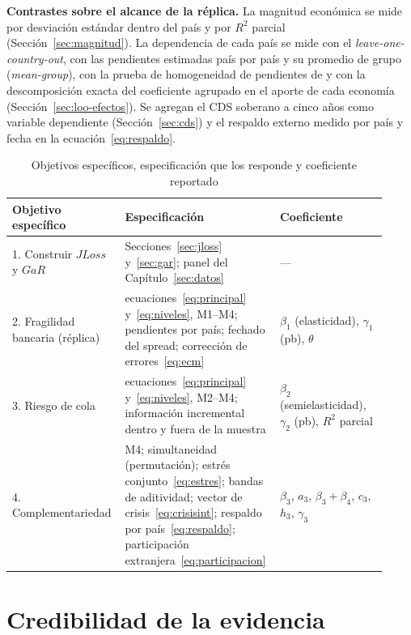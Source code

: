 \textbf{Contrastes sobre el alcance de la réplica.} La magnitud económica se mide por desviación estándar dentro del país y por $R^2$ parcial (Sección~\ref{sec:magnitud}). La dependencia de cada país se mide con el \textit{leave-one-country-out}, con las pendientes estimadas país por país y su promedio de grupo (\textit{mean-group}), con la prueba de homogeneidad de pendientes de \citet{PesaranYamagata2008} y con la descomposición exacta del coeficiente agrupado en el aporte de cada economía (Sección~\ref{sec:loo-efectos}). Se agregan el CDS soberano a cinco años como variable dependiente (Sección~\ref{sec:cds}) y el respaldo externo medido por país y fecha en la ecuación~\eqref{eq:respaldo}.

\begin{table}[htbp]
\centering
\small
\caption[Objetivos específicos y especificaciones]{Objetivos específicos, especificación que los responde y coeficiente reportado}
\label{tab:objetivos-especificaciones}
\begin{tabular}{p{0.28\linewidth}p{0.36\linewidth}p{0.28\linewidth}}
\toprule
Objetivo específico & Especificación & Coeficiente \\
\midrule
1. Construir $JLoss$ y $GaR$ & Secciones~\ref{sec:jloss} y~\ref{sec:gar}; panel del Capítulo~\ref{sec:datos} & --- \\
2. Fragilidad bancaria (réplica) & ecuaciones~\eqref{eq:principal} y~\eqref{eq:niveles}, M1--M4; pendientes por país; fechado del spread; corrección de errores~\eqref{eq:ecm} & $\beta_1$ (elasticidad), $\gamma_1$ (pb), $\theta$ \\
3. Riesgo de cola & ecuaciones~\eqref{eq:principal} y~\eqref{eq:niveles}, M2--M4; información incremental dentro y fuera de la muestra & $\beta_2$ (semielasticidad), $\gamma_2$ (pb), $R^2$ parcial \\
4. Complementariedad & M4; simultaneidad (permutación); estrés conjunto~\eqref{eq:estres}; bandas de aditividad; vector de crisis~\eqref{eq:crisisint}; respaldo por país~\eqref{eq:respaldo}; participación extranjera~\eqref{eq:participacion} & $\beta_3$, $a_3$, $\beta_3+\beta_4$, $c_3$, $h_3$, $\gamma_3$ \\
\bottomrule
\end{tabular}
\end{table}

\section{Credibilidad de la evidencia}
\label{sec:credibilidad}

